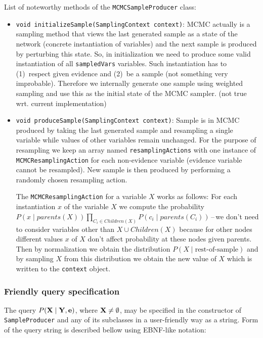 \documentclass[english,cover]{fitthesis} %
\newcommand{\srccode}[1]{{\tt #1}}         %
\newcommand{\vars}[1]{{\bold{#1}}}         %
\newcommand{\todo}[1]{{\color{red}#1}}
\begin{document}
\medskip
List of noteworthy methods of the \srccode{MCMCSampleProducer} class:
\begin{itemize}
	\item \srccode{void initializeSample(SamplingContext context)}: MCMC actually is a sampling method that views the last generated sample as a state of the network (concrete instantiation of variables) and the next sample is produced by perturbing this state. So, in initialization we need to produce some valid instantiation of all \srccode{sampledVars} variables. Such instantiation has to (1)~respect given evidence and (2)~be a  sample (not something very improbable). Therefore we internally generate one sample using weighted sampling and use this as the initial state of the MCMC sampler. \todo{(not true wrt. current implementation)}
	\item \srccode{void produceSample(SamplingContext context)}: Sample is in MCMC produced by taking the last generated sample and resampling a single variable while values of other variables remain unchanged. For the purpose of resampling we keep an array named \srccode{resamplingActions} with one instance of \srccode{MCMCResamplingAction} for each non-evidence variable (evidence variable cannot be resampled). New sample is then produced by performing a randomly chosen resampling action.
	
	The \srccode{MCMCResamplingAction} for a variable $X$ works as follows: For each instantiation $x$ of the variable $X$ we compute the probability $P(x \mid parents(X)) \prod_{C_i \in Children(X)} P(c_i \mid parents(C_i))$\,--\,we don't need to consider variables other than $X \cup Children(X)$ because for other nodes different values $x$ of $X$ don't affect probability at these nodes given parents. Then by normalization we obtain the distribution $P(X \mid \text{rest-of-sample})$ and by sampling $X$ from this distribution we obtain the new value of $X$ which is written to the \srccode{context} object.
\end{itemize}


\subsubsection{Friendly query specification}
The query $P(\vars{X} \mid \vars{Y}, \vars{e})$, where $\vars{X} \neq \emptyset$, may be specified in the constructor of \srccode{SampleProducer} and any of its subclasses in a user-friendly way as a string. Form of the query string is described bellow using EBNF-like notation:
\end{document}
